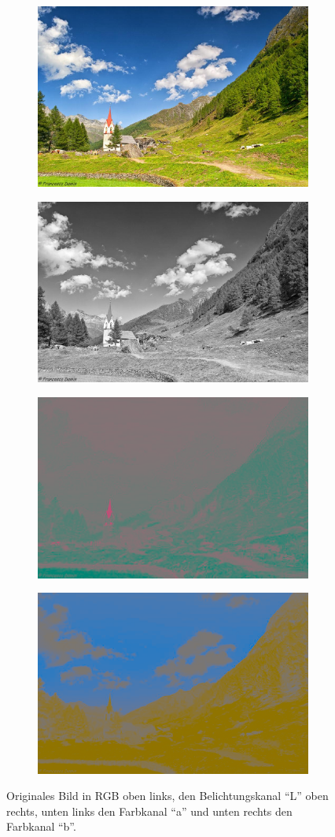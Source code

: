 \begin{figure}[H]
  \vspace{1cm}
  \centering
  \begin{subfigure}
    \centering
    \includegraphics[width=.35\textwidth]{resources/colorspace/image.jpg}
  \end{subfigure}
  \begin{subfigure}
    \centering
    \includegraphics[width=.35\textwidth]{resources/colorspace/grayscale.png}
  \end{subfigure}


  \begin{subfigure}
    \centering
    \includegraphics[width=.35\textwidth]{resources/colorspace/a_channel.png}
  \end{subfigure}
  \begin{subfigure}
    \centering
    \includegraphics[width=.35\textwidth]{resources/colorspace/b_channel.png}
  \end{subfigure}
  \caption{Originales Bild in RGB oben links, den Belichtungskanal ``L'' oben rechts, unten links den Farbkanal ``a'' und unten rechts den Farbkanal ``b''.}
  \label{image:farbraum}
\end{figure}


